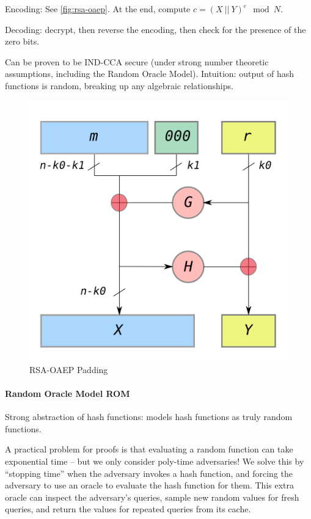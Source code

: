 Encoding:
See \autoref{fig:rsa-oaep}.
At the end, compute $c = (X\ ||\ Y)^e \mod N$.

Decoding:
decrypt, then reverse the encoding, then check for the presence of the zero bits.

Can be proven to be IND-CCA secure (under strong number theoretic assumptions, including the Random Oracle Model).
Intuition: output of hash functions is random, breaking up any algebraic relationships.

\begin{figure}[h]
    \centering
	\includegraphics[scale=0.45]{images/rsa-oaep.png}
    \caption{RSA-OAEP Padding}
    \label{fig:rsa-oaep}
\end{figure}

\paragraph{Random Oracle Model ROM}
Strong abstraction of hash functions: models hash functions as truly random functions.

A practical problem for proofs is that evaluating a random function can take exponential time -- but we only consider poly-time adversaries!
We solve this by ``stopping time'' when the adversary invokes a hash function,
and forcing the adversary to use an oracle to evaluate the hash function for them.
This extra oracle can inspect the adversary's queries, sample new random values for fresh queries, and return the values for repeated queries from its cache.


